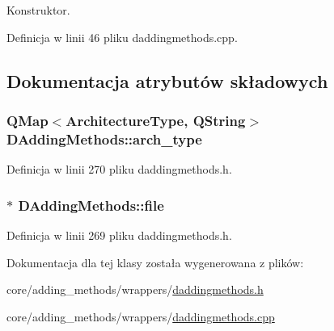 Konstruktor. 



Definicja w linii 46 pliku daddingmethods.\-cpp.



\subsection{Dokumentacja atrybutów składowych}
\hypertarget{class_d_adding_methods_aa368755d8aba57f3a92877d1fbe925b3}{
\subsubsection[{arch\-\_\-type}]{\setlength{\rightskip}{0pt plus 5cm}Q\-Map$<${\bf Architecture\-Type}, Q\-String$>$ D\-Adding\-Methods\-::arch\-\_\-type\hspace{0.3cm}{\ttfamily [protected]}}}\label{class_d_adding_methods_aa368755d8aba57f3a92877d1fbe925b3}


Definicja w linii 270 pliku daddingmethods.\-h.

\hypertarget{class_d_adding_methods_a87bdff1dd02ac26df6c10648fe406cd9}{
\subsubsection[{file}]{$\ast$ D\-Adding\-Methods\-::file\hspace{0.3cm}{\ttfamily [protected]}}}\label{class_d_adding_methods_a87bdff1dd02ac26df6c10648fe406cd9}


Definicja w linii 269 pliku daddingmethods.\-h.



Dokumentacja dla tej klasy została wygenerowana z plików\-:\begin{DoxyCompactItemize}
\item 
core/adding\-\_\-methods/wrappers/\hyperlink{daddingmethods_8h}{daddingmethods.\-h}\item 
core/adding\-\_\-methods/wrappers/\hyperlink{daddingmethods_8cpp}{daddingmethods.\-cpp}\end{DoxyCompactItemize}
